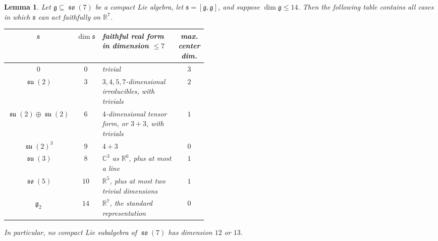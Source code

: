 \documentclass[11pt]{article}
\newtheorem{lemma}{Lemma}
\DeclareMathOperator{\so}{\mathfrak{so}}
\DeclareMathOperator{\su}{\mathfrak{su}}
\begin{document}
\begin{lemma}\label{lem:so7-table}
Let $\mathfrak g\subseteq\so(7)$ be a compact Lie algebra, let
$\mathfrak s=[\mathfrak g,\mathfrak g]$, and suppose
$\dim\mathfrak g\leq 14$. Then the following table contains all cases in
which $\mathfrak s$ can act faithfully on $\mathbb R^7$.
\begin{center}
\small
\renewcommand{\arraystretch}{1.15}
\begin{tabular}{c|c|p{0.46\linewidth}|c}
$\mathfrak s$ & $\dim\mathfrak s$
& faithful real form in dimension $\leq 7$
& max. center dim.\\ \hline
$0$ & $0$ & trivial & $3$\\
$\su(2)$ & $3$ & $3,4,5,7$-dimensional irreducibles, with trivials & $2$\\
$\su(2)\oplus\su(2)$ & $6$
& $4$-dimensional tensor form, or $3+3$, with trivials & $1$\\
$\su(2)^3$ & $9$ & $4+3$ & $0$\\
$\su(3)$ & $8$ & $\mathbb C^3$ as $\mathbb R^6$, plus at most a line & $1$\\
$\so(5)$ & $10$ & $\mathbb R^5$, plus at most two trivial dimensions & $1$\\
$\mathfrak g_2$ & $14$ & $\mathbb R^7$, the standard representation & $0$
\end{tabular}
\end{center}
In particular, no compact Lie subalgebra of $\so(7)$ has dimension $12$ or
$13$.
\end{lemma}
\end{document}
